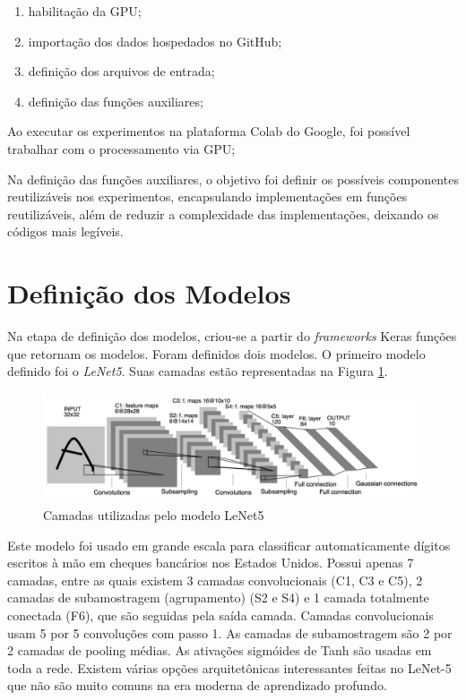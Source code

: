 \documentclass[12pt]{article}
\begin{document}
\begin{enumerate}
  \item habilitação da GPU;
  \item importação dos dados hospedados no GitHub;
  \item definição dos arquivos de entrada;
  \item definição das funções auxiliares;
\end{enumerate}

Ao executar os experimentos na plataforma Colab do Google, foi possível trabalhar com o processamento via GPU;

Na definição das funções auxiliares, o objetivo foi definir os possíveis componentes reutilizáveis nos experimentos, encapsulando implementações em funções reutilizáveis, além de reduzir a complexidade das implementações, deixando os códigos mais legíveis.

\section{Definição dos Modelos}

Na etapa de definição dos modelos, criou-se a partir do \textit{frameworks} Keras funções que retornam os modelos. Foram definidos dois modelos. O primeiro modelo definido foi o \textit{LeNet5}. Suas camadas estão representadas na Figura \ref{fig:image_lenet5}.

\begin{figure}[!htb]
  \centering
  \includegraphics[width=35em]{images/image_lenet.jpeg}
  \caption{Camadas utilizadas pelo modelo LeNet5}
  \label{fig:image_lenet5}
\end{figure}

Este modelo foi usado em grande escala para classificar automaticamente dígitos escritos à mão em cheques bancários nos Estados Unidos. Possui apenas 7 camadas, entre as quais existem 3 camadas convolucionais (C1, C3 e C5), 2 camadas de subamostragem (agrupamento) (S2 e S4) e 1 camada totalmente conectada (F6), que são seguidas pela saída camada. Camadas convolucionais usam 5 por 5 convoluções com passo 1. As camadas de subamostragem são 2 por 2 camadas de pooling médias. As ativações sigmóides de Tanh são usadas em toda a rede. Existem várias opções arquitetônicas interessantes feitas no LeNet-5 que não são muito comuns na era moderna de aprendizado profundo.
\end{document}
